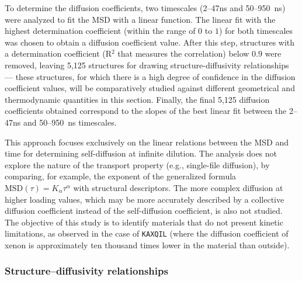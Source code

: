 \documentclass[main]{subfiles}
\begin{document}
To determine the diffusion coefficients, two timescales (2--47\si{\ns} and 50--950~\si{\ns}) were analyzed to fit the MSD with a linear function. The linear fit with the highest determination coefficient (within the range of $0$ to $1$) for both timescales was chosen to obtain a diffusion coefficient value. After this step, structures with a determination coefficient (R$^2$ that measures the correlation) below $0.9$ were removed, leaving 5,125 structures for drawing structure-diffusivity relationships --- these structures, for which there is a high degree of confidence in the diffusion coefficient values, will be comparatively studied against different geometrical and thermodynamic quantities in this section. Finally, the final 5,125 diffusion coefficients obtained correspond to the slopes of the best linear fit between the 2--47\si{\ns} and 50--950~\si{\ns} timescales.

This approach focuses exclusively on the linear relations between the MSD and time for determining self-diffusion at infinite dilution. The analysis does not explore the nature of the transport property (e.g., single-file diffusion\autocite{Lin_2005}), by comparing, for example, the exponent of the generalized formula $\text{MSD}(\tau) = K_\alpha\tau^\alpha$ with structural descriptors. The more complex diffusion at higher loading values, which may be more accurately described by a collective diffusion coefficient instead of the self-diffusion coefficient, is also not studied. The objective of this study is to identify materials that do not present kinetic limitations, as observed in the case of \texttt{KAXQIL}\autocite{Banerjee2012} (where the diffusion coefficient of xenon is approximately ten thousand times lower in the material than outside).

\subsubsection{Structure--diffusivity relationships}\label{sct:xenon_diff_screen}
\end{document}
